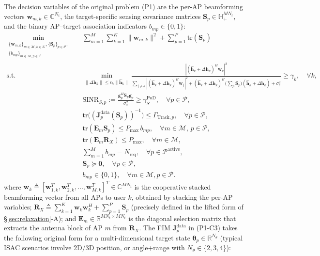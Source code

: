 \documentclass[12pt,a4paper]{article}
\newcommand{\vect}[1]{\mathbf{#1}}
\newcommand{\mat}[1]{\mathbf{#1}}
\newcommand{\tr}{\text{tr}}
\begin{document}
The decision variables of the original problem (P1) are the per-AP beamforming vectors $\vect{w}_{m,k} \in \mathbb{C}^{N_t}$, the target-specific sensing covariance matrices $\mat{S}_p\in\mathbb{H}_+^{MN_t}$, and the binary AP--target association indicators $b_{mp}\in\{0,1\}$:
\begin{align}
\min_{\substack{\{\vect{w}_{m,k}\}_{m \in \mathcal{M}, k \in \mathcal{K}}, \{\mat{S}_p\}_{p \in \mathcal{P}}, \\ \{b_{mp}\}_{m \in \mathcal{M}, p \in \mathcal{P}}}} \quad
& \sum_{m=1}^{M} \sum_{k=1}^{K} \|\vect{w}_{m,k}\|^2 + \sum_{p=1}^{P} \tr(\mat{S}_p) \tag{P1-objective} \\
\text{s.t.} \quad
& \min_{\|\Delta\vect{h}_k\| \leq \epsilon_h \|\hat{\vect{h}}_k\|} \frac{|(\hat{\vect{h}}_k + \Delta\vect{h}_k)^H \vect{w}_k|^2}{\sum_{j \neq k} |(\hat{\vect{h}}_k + \Delta\vect{h}_k)^H \vect{w}_j|^2 + (\hat{\vect{h}}_k + \Delta\vect{h}_k)^H \big(\textstyle\sum_p \mat{S}_p\big) (\hat{\vect{h}}_k + \Delta\vect{h}_k) + \sigma_c^2} \geq \gamma_k, \quad \forall k, \tag{P1-C1} \\
& \text{SINR}_{S,p} := \frac{\vect{g}_p^H \mat{S}_p \vect{g}_p}{\sigma_s^2} \geq \gamma_S^{\text{PoD}}, \quad \forall p \in \mathcal{P}, \tag{P1-C2} \\
& \tr\big((\mat{J}_p^{\text{data}}(\mat{S}_p))^{-1}\big) \leq \Gamma_{\text{Track}, p}, \quad \forall p \in \mathcal{P}, \tag{P1-C3} \\
& \tr(\mat{E}_m \mat{S}_p) \leq P_{\max} \, b_{mp}, \quad \forall m \in \mathcal{M}, \, p \in \mathcal{P}, \tag{P1-C4'a} \label{eq:p1c4a} \\
& \tr(\mat{E}_m \mat{R}_X) \leq P_{\max}, \quad \forall m \in \mathcal{M}, \tag{P1-C4'b} \label{eq:p1c4b} \\
& \sum_{m=1}^{M} b_{mp} = N_{\text{req}}, \quad \forall p \in \mathcal{P}^{\text{active}}, \tag{P1-C5'} \\
& \mat{S}_p \succeq \mat{0}, \quad \forall p \in \mathcal{P}, \tag{P1-C6} \\
& b_{mp}\in\{0,1\}, \quad \forall m \in \mathcal{M}, p \in \mathcal{P}. \tag{P1-C7'}
\end{align}
where $\vect{w}_k \triangleq [\vect{w}_{1,k}^T, \vect{w}_{2,k}^T, \ldots, \vect{w}_{M,k}^T]^T \in \mathbb{C}^{MN_t}$ is the cooperative stacked beamforming vector from all APs to user $k$, obtained by stacking the per-AP variables; $\mat{R}_X \triangleq \sum_{k=1}^{K} \vect{w}_k \vect{w}_k^H + \sum_{p=1}^{P} \mat{S}_p$ (precisely defined in the lifted form of \S\ref{sec:relaxation}-A); and $\mat{E}_m \in \mathbb{R}^{MN_t \times MN_t}$ is the diagonal selection matrix that extracts the antenna block of AP $m$ from $\mat{R}_X$. The FIM $\mat{J}_p^{\text{data}}$ in (P1-C3) takes the following original form for a multi-dimensional target state $\boldsymbol{\theta}_p \in \mathbb{R}^{N_\theta}$ (typical ISAC scenarios involve 2D/3D position, or angle+range with $N_\theta \in \{2, 3, 4\}$):
\end{document}
